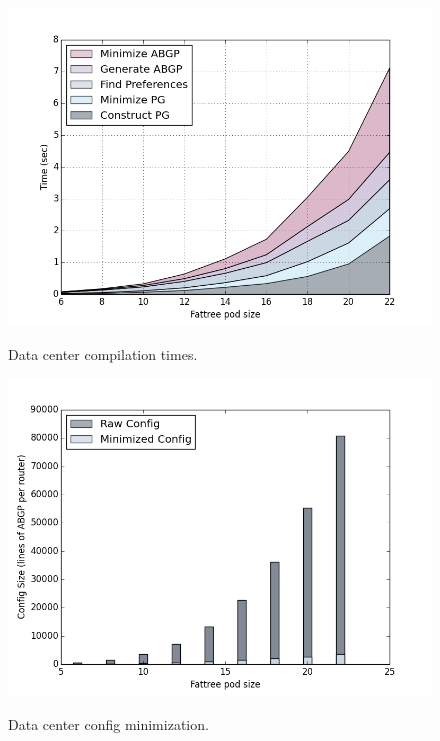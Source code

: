 \begin{figure}[t!]
\centering
\includegraphics[width=\columnwidth]{figures/compilation-times-dc.png}
\label{fig:compilation-times-dc}
\caption{Data center compilation times.}
\end{figure}

\begin{figure}[t!]
\centering
\includegraphics[width=\columnwidth]{figures/config-compression-dc.png}
\label{fig:compilation-compression-dc}
\caption{Data center config minimization.}
\end{figure}